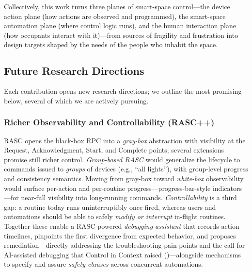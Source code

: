 Collectively, this work turns three planes of smart-space control---the device action plane (how actions are observed and programmed), the smart-space automation plane (where control logic runs), and the human interaction plane (how occupants interact with it)---from sources of fragility and frustration into design targets shaped by the needs of the people who inhabit the space.


\subsection{Future Research Directions}
\label{conc:sec:future}

Each contribution opens new research directions; we outline the most promising below, several of which we are actively pursuing.


\subsubsection{Richer Observability and Controllability (RASC++)}
\label{conc:sec:rascpp}

RASC opens the black-box RPC into a \emph{gray-box} abstraction with visibility at the Request, Acknowledgment, Start, and Complete points; several extensions promise still richer control. \emph{Group-based RASC} would generalize the lifecycle to commands issued to \emph{groups} of devices (e.g., ``all lights''), with group-level progress and consistency semantics. Moving from gray-box toward \emph{white-box} observability would surface per-action and per-routine progress---progress-bar-style indicators---for near-full visibility into long-running commands. \emph{Controllability} is a third gap: a routine today runs uninterruptibly once fired, whereas users and automations should be able to safely \emph{modify or interrupt} in-flight routines. Together these enable a RASC-powered \emph{debugging assistant} that records action timelines, pinpoints the first divergence from expected behavior, and proposes remediation---directly addressing the troubleshooting pain points and the call for AI-assisted debugging that Control in Context raised ()---alongside mechanisms to specify and assure \emph{safety clauses} across concurrent automations. 


